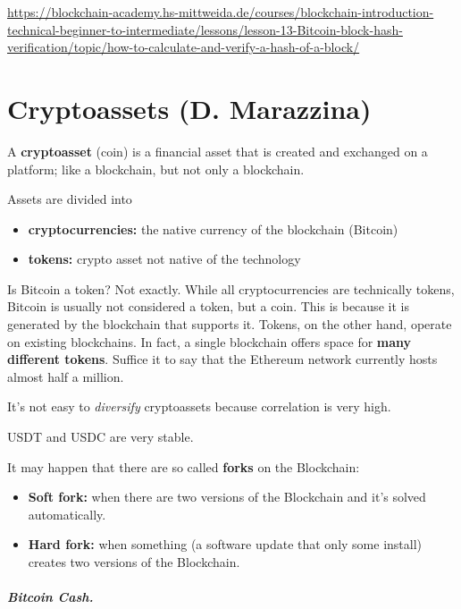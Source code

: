 {\scriptsize\url{https://blockchain-academy.hs-mittweida.de/courses/blockchain-introduction-technical-beginner-to-intermediate/lessons/lesson-13-Bitcoin-block-hash-verification/topic/how-to-calculate-and-verify-a-hash-of-a-block/}}

\chapter{Cryptoassets (D. Marazzina)}

A \textbf{cryptoasset} (coin) is a financial asset that is created and exchanged on a platform; like a blockchain, but not only a blockchain.

Assets are divided into
\begin{itemize}
	\item \textbf{cryptocurrencies:} the native currency of the blockchain (Bitcoin)
	\item \textbf{tokens:} crypto asset not native of the technology
\end{itemize}

Is Bitcoin a token? Not exactly. While all cryptocurrencies are technically tokens, Bitcoin is usually not considered a token, but a coin. This is because it is generated by the blockchain that supports it. Tokens, on the other hand, operate on existing blockchains. In fact, a single blockchain offers space for \textbf{many different tokens}. Suffice it to say that the Ethereum network currently hosts almost half a million.

It's not easy to \textit{diversify} cryptoassets because correlation is very high.

USDT and USDC are very stable.

It may happen that there are so called \textbf{forks} on the Blockchain:
\begin{itemize}
	\item \textbf{Soft fork:} when there are two versions of the Blockchain and it's solved automatically.
	\item \textbf{Hard fork:} when something (a software update that only some install) creates two versions of the Blockchain.
\end{itemize}

\paragraph*{Bitcoin Cash.}

